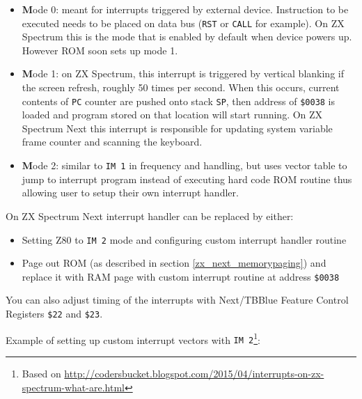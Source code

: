 \documentclass[twoside,openright,a4paper]{book}
\begin{document}
\begin{itemize}
	\item {\textbf Mode 0}: meant for interrupts triggered by external device. Instruction to be executed needs to be placed on data bus ({\tt RST} or {\tt CALL} for example). On ZX Spectrum this is the mode that is enabled by default when device powers up. However ROM soon sets up mode 1.
	
	\item {\textbf Mode 1}: on ZX Spectrum, this interrupt is triggered by vertical blanking if the screen refresh, roughly 50 times per second. When this occurs, current contents of {\tt PC} counter are pushed onto stack {\tt SP}, then address of {\tt \$0038} is loaded and program stored on that location will start running. On ZX Spectrum Next this interrupt is responsible for updating system variable frame counter and scanning the keyboard.
	
	\item {\textbf Mode 2}: similar to {\tt IM 1} in frequency and handling, but uses vector table to jump to interrupt program instead of executing hard code ROM routine thus allowing user to setup their own interrupt handler.
\end{itemize}

On ZX Spectrum Next interrupt handler can be replaced by either:

\begin{itemize}
	\item Setting Z80 to {\tt IM 2} mode and configuring custom interrupt handler routine
	
	\item Page out ROM (as described in section \ref{zx_next_memorypaging}) and replace it with RAM page with custom interrupt routine at address {\tt \$0038}
\end{itemize}

You can also adjust timing of the interrupts with Next/TBBlue Feature Control Registers {\tt \$22} and {\tt \$23}.

\pagebreak
Example of setting up custom interrupt vectors with {\tt IM 2}\footnote{Based on \url{http://codersbucket.blogspot.com/2015/04/interrupts-on-zx-spectrum-what-are.html}}:
\end{document}
